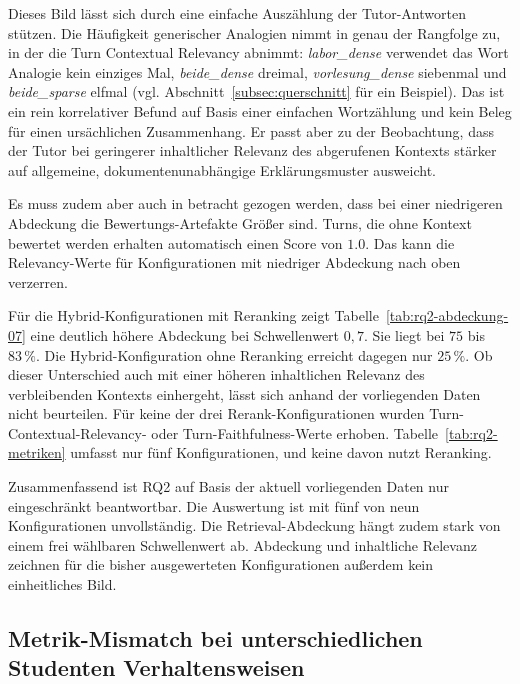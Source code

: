 Dieses Bild lässt sich durch eine einfache Auszählung der Tutor-Antworten stützen. Die Häufigkeit generischer Analogien nimmt in genau der Rangfolge zu, in der die Turn Contextual Relevancy abnimmt: \emph{labor\_dense} verwendet das Wort \glqq Analogie\grqq{} kein einziges Mal, \emph{beide\_dense} dreimal, \emph{vorlesung\_dense} siebenmal und \emph{beide\_sparse} elfmal (vgl. Abschnitt~\ref{subsec:querschnitt} für ein Beispiel). Das ist ein rein korrelativer Befund auf Basis einer einfachen Wortzählung und kein Beleg für einen ursächlichen Zusammenhang. Er passt aber zu der Beobachtung, dass der Tutor bei geringerer inhaltlicher Relevanz des abgerufenen Kontexts stärker auf allgemeine, dokumentenunabhängige Erklärungsmuster ausweicht.

Es muss zudem aber auch in betracht gezogen werden, dass bei einer niedrigeren Abdeckung die Bewertungs-Artefakte Größer sind. Turns, die ohne Kontext bewertet werden erhalten automatisch einen Score von $1.0$. Das kann die Relevancy-Werte für Konfigurationen mit niedriger Abdeckung nach oben verzerren.

Für die Hybrid-Konfigurationen mit Reranking zeigt Tabelle~\ref{tab:rq2-abdeckung-07} eine deutlich
höhere Abdeckung bei Schwellenwert $0{,}7$. Sie liegt bei $75$ bis $83\,\%$. Die
Hybrid-Konfiguration ohne Reranking erreicht dagegen nur $25\,\%$. Ob dieser Unterschied auch mit
einer höheren inhaltlichen Relevanz des verbleibenden Kontexts einhergeht, lässt sich anhand der
vorliegenden Daten nicht beurteilen. Für keine der drei Rerank-Konfigurationen wurden
Turn-Contextual-Relevancy- oder Turn-Faithfulness-Werte erhoben. Tabelle~\ref{tab:rq2-metriken}
umfasst nur fünf Konfigurationen, und keine davon nutzt Reranking.

Zusammenfassend ist RQ2 auf Basis der aktuell vorliegenden Daten nur eingeschränkt beantwortbar.
Die Auswertung ist mit fünf von neun Konfigurationen unvollständig. Die Retrieval-Abdeckung hängt
zudem stark von einem frei wählbaren Schwellenwert ab. Abdeckung und inhaltliche Relevanz zeichnen
für die bisher ausgewerteten Konfigurationen außerdem kein einheitliches Bild.


\subsection{Metrik-Mismatch bei unterschiedlichen Studenten Verhaltensweisen}
\label{subsec:metrik-mismatch}

